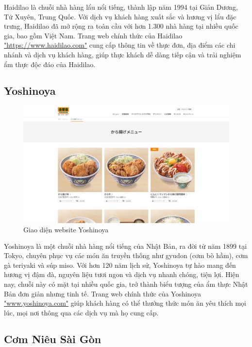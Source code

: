 Haidilao là chuỗi nhà hàng lẩu nổi tiếng, thành lập năm 1994 tại Giản Dương, Tứ Xuyên, Trung Quốc. Với dịch vụ khách hàng xuất sắc và hương vị lẩu đặc trưng, Haidilao đã mở rộng ra toàn cầu với hơn 1.300 nhà hàng tại nhiều quốc gia, bao gồm Việt Nam. Trang web chính thức của Haidilao \href{https://www.haidilao.com/}{"https://www.haidilao.com"} cung cấp thông tin về thực đơn, địa điểm các chi nhánh và dịch vụ khách hàng, giúp thực khách dễ dàng tiếp cận và trải nghiệm ẩm thực độc đáo của Haidilao.

\subsection{Yoshinoya}

\begin{figure}[H]
    \centering
    \includegraphics[width=15cm]{Images/yoshinoya.png}
    \vspace{0.5cm}
    \caption{Giao diện website Yoshinoya}
    \label{fig:my_label}
\end{figure}

Yoshinoya là một chuỗi nhà hàng nổi tiếng của Nhật Bản, ra đời từ năm 1899 tại Tokyo, chuyên phục vụ các món ăn truyền thống như gyudon (cơm bò hầm), cơm gà teriyaki và súp miso. Với hơn 120 năm lịch sử, Yoshinoya tự hào mang đến hương vị đậm đà, nguyên liệu tươi ngon và dịch vụ nhanh chóng, tiện lợi. Hiện nay, chuỗi này có mặt tại nhiều quốc gia, trở thành biểu tượng của ẩm thực Nhật Bản đơn giản nhưng tinh tế. Trang web chính thức của Yoshinoya \href{www.yoshinoya.com}{"www.yoshinoya.com"}  giúp khách hàng có thể thưởng thức món ăn yêu thích mọi lúc, mọi nơi thông qua các dịch vụ mà họ cung cấp.

\subsection{Cơm Niêu Sài Gòn}

